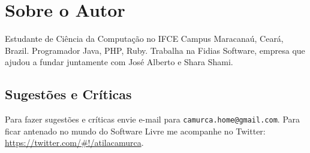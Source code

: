 
\chapter{Sobre o Autor}

Estudante de Ciência da Computação no IFCE Campus Maracanaú, Ceará, Brazil. Programador Java,
PHP, Ruby. Trabalha na Fidias Software, empresa que ajudou a fundar juntamente com José Alberto
e Shara Shami.

\section{Sugestões e Críticas}

Para fazer sugestões e críticas envie e-mail para \texttt{camurca.home@gmail.com}. Para ficar antenado
no mundo do Software Livre me acompanhe no Twitter:\\ \url{https://twitter.com/#!/atilacamurca}.
